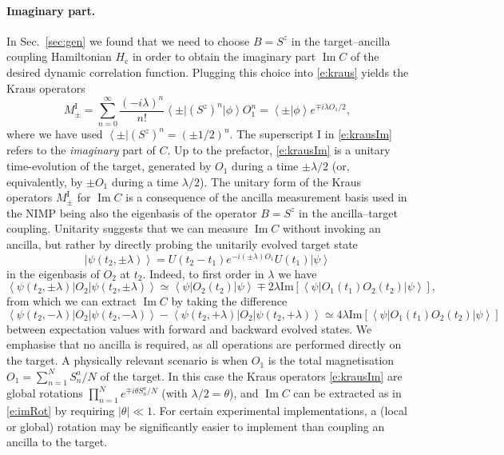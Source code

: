 \documentclass[epjST,numbook]{svjour}
\newcommand{\ket}[1]{\left \vert #1 \right >}
\newcommand{\bra}[1]{\left < #1 \right \vert}
\newcommand{\matel}[3]{ \displaystyle \left\langle #1 \right \vert #2 \left\vert  #3 \right\rangle }
\newcommand{\innprod}[2]{ \displaystyle \left\langle #1 \vert #2 \right\rangle }
\newcommand{\impart}[1]{\text{Im}\left[ #1 \right]}
\DeclareMathOperator{\imp }{\mathrm{Im}}
\begin{document}
\paragraph{Imaginary part.}
In Sec.~\ref{sec:gen} we found that we need to choose $B=S^z$ in the target--ancilla coupling Hamiltonian $H_\text{c}$ in order to obtain the imaginary part $\imp C$ of the desired dynamic correlation function. Plugging this choice into \eqref{e:kraus} yields the Kraus operators%
\begin{equation}\label{e:krausIm}
		M^\text{I}_{\pm} = \sum_{n=0}^\infty \frac{(-i\lambda)^n}{n!} \matel{\pm}{(S^z)^n}{\phi}O_1^n  %
		= \innprod{\pm}{\phi} e^{\mp i\lambda O_1 /2} ,
\end{equation}
where we have used $\bra{\pm}(S^z)^n=(\pm1/2)^n$. The superscript $\text{I}$ in \eqref{e:krausIm} refers to the {\em imaginary} part of $C$.
Up to the prefactor, \eqref{e:krausIm} is a unitary time-evolution of the target, generated by $O_1$ during a time $\pm\lambda /2$ (or, equivalently, by $\pm O_1$ during a time $\lambda /2$). The unitary form of the Kraus operators $M_\pm^\text{I}$ for $\imp C$ is a consequence of the ancilla measurement basis used in the NIMP being also the eigenbasis of the operator $B=S^z$ in the ancilla--target coupling. Unitarity suggests that we can measure $\imp C$ without invoking an ancilla, but rather by directly probing the unitarily evolved target state
\begin{equation}
	\ket{\psi(t_2,\pm\lambda)} = U(t_2-t_1)e^{-i(\pm\lambda) O_1}U(t_1)\ket{\psi}
\end{equation}
in the eigenbasis of $O_2$ at $t_2$. Indeed, to first order in $\lambda$ we have
\begin{equation}
	\matel{\psi(t_2,\pm\lambda)}{O_2}{\psi(t_2,\pm\lambda)} \simeq \matel{\psi}{O_2(t_2)}{\psi} \mp2\lambda\impart{\matel{\psi}{O_1(t_1)O_2(t_2)}{\psi}},
\end{equation}
from which we can extract $\imp C$ by taking the difference
\begin{equation}\label{e:imRot}
	\matel{\psi(t_2,-\lambda)}{O_2}{\psi(t_2,-\lambda)} -	\matel{\psi(t_2,+\lambda)}{O_2}{\psi(t_2,+\lambda)} \simeq 4\lambda \impart{\matel{\psi}{O_1(t_1)O_2(t_2)}{\psi}}
\end{equation}
between expectation values with forward and backward evolved states.
We emphasise that no ancilla is required, as all operations are performed directly on the target. A physically relevant scenario is when $O_1$ is the total magnetisation ${O_1=\sum_{n=1}^N S_n^a/N}$ of the target. In this case the Kraus operators \eqref{e:krausIm} are global rotations $\prod_{n=1}^N e^{\mp i \theta S_n^a/N}$ (with $\lambda/2=\theta$), and $\imp C$ can be extracted as in \eqref{e:imRot} by requiring $|\theta|\ll1$. For certain experimental implementations, a (local or global) rotation may be significantly easier to implement than coupling an ancilla to the target.
\end{document}
